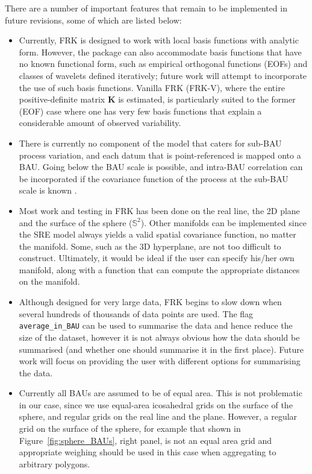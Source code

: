 \documentclass{article}\usepackage[]{graphicx}\usepackage[]{color}
\let\code=\texttt
\newcommand{\pkg}[1]{{\fontseries{b}\selectfont #1}}
\newcommand{\Kmat} {\textbf{K}}
\begin{document}
There are a number of important features that remain to be implemented in future revisions, some of which are listed below:
\begin{itemize}

\item Currently, \pkg{FRK} is designed to work with local basis functions with analytic form. However, the package can also accommodate basis functions that have no known functional form, such as empirical orthogonal functions (EOFs) and classes of wavelets defined iteratively; future work will attempt to incorporate the use of such basis functions. Vanilla FRK (FRK-V), where the entire positive-definite matrix $\Kmat$ is estimated, is particularly suited to the former (EOF) case where one has very few basis functions that explain a considerable amount of observed variability.

\item There is currently no component of the model that caters for sub-BAU process variation, and each datum that is point-referenced is mapped onto a BAU. Going below the BAU scale is possible, and intra-BAU correlation can be incorporated if the covariance function of the process at the sub-BAU scale is known \citep{Wikle_2005}.

\item Most work and testing in \pkg{FRK} has been done on the real line, the 2D plane and the surface of the sphere ($\mathbb{S}^2$). Other manifolds can be implemented since the SRE model always yields a valid spatial covariance function, no matter the manifold. Some, such as the 3D hyperplane, are not too difficult to construct. Ultimately, it would be ideal if the user can specify his/her own manifold, along with a function that can compute the appropriate distances on the manifold.

\item Although designed for very large data, \pkg{FRK} begins to slow down when several hundreds of thousands of data points are used. The flag \code{average\_in\_BAU} can be used to summarise the data and hence reduce the size of the dataset, however it is not always obvious how the data should be summarised (and whether one should summarise it in the first place). Future work will focus on providing the user with different options for summarising the data.

\item Currently all BAUs are assumed to be of equal area. This is not problematic in our case, since we use equal-area icosahedral grids on the surface of the sphere, and regular grids on the real line and the plane. However, a regular grid on the surface of the sphere, for example that shown in Figure~\ref{fig:sphere_BAUs}, right panel, is not an equal area grid and appropriate weighing should be used in this case when aggregating to arbitrary polygons.

\end{itemize}
\end{document}
